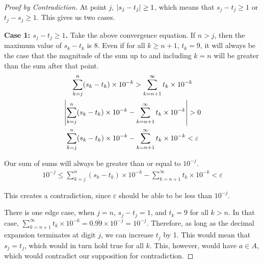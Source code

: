\documentclass[12pt]{report}
\newenvironment{case}[2]{\par\textbf{Case #1: #2.}}{}
\begin{document}
\begin{proof}[Proof by Contradiction]
        At point $j$, $\left| s_j - t_j \right| \geq 1$, which means that $s_j - t_j \geq 1$ or $t_j - s_j \geq 1$.
        This gives us two cases.

        \begin{case}{1}{$s_j - t_j \geq 1$}
            Take the above convergence equation.
            If $n > j$, then the maximum value of $s_k - t_k$ is $8$.
            Even if for all $k \geq n+1$, $t_k = 9$, it will always be the case that the magnitude of the sum up to and including $k = n$ will be greater than the sum after that point.
            \begin{gather}
                \sum_{k=j}^{n} (s_k - t_k) \times 10^{-k} > \sum_{k=n+1}^{\infty} t_k \times 10^{-k}\\
                \left| \sum_{k=j}^{n} (s_k - t_k) \times 10^{-k} - \sum_{k=n+1}^{\infty} t_k \times 10^{-k} \right| > 0\\
                \sum_{k=j}^{n} (s_k - t_k) \times 10^{-k} - \sum_{k=n+1}^{\infty} t_k \times 10^{-k} < \varepsilon
            \end{gather}

            Our sum of sums will always be greater than or equal to $10^{-j}$.
            \begin{gather}
                10^{-j} \leq \sum_{k=j}^{n} (s_k - t_k) \times 10^{-k} - \sum_{k=n+1}^{\infty} t_k \times 10^{-k} < \varepsilon
            \end{gather}

            This creates a contradiction, since $\varepsilon$ should be able to be less than $10^{-j}$.

            There is one edge case, when $j = n$, $s_j - t_j = 1$, and $t_k = 9$ for all $k > n$.
            In that case, $\sum_{k=n+1}^{\infty} t_k \times 10^{-k} = 0.\overline{99} \times 10^{-j} = 10^{-j}$.
            Therefore, as long as the decimal expansion terminates at digit $j$, we can increase $t_j$ by 1.
            This would mean that $s_j = t_j$, which would in turn hold true for all $k$.
            This, however, would have $a \in A$, which would contradict our supposition for contradiction.
        \end{case}


\end{proof}
\end{document}

